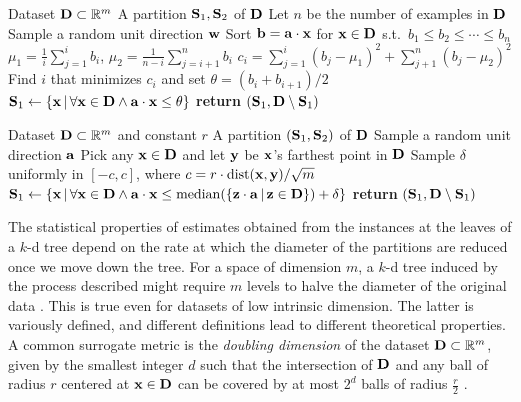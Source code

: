 \begin{algorithm}[t]
  \caption{}\label{alg:splitsid}
  \begin{algorithmic}[1]
    \Require Dataset $\mathbf{D}\subset\mathbb{R}^m$
    \Ensure A partition $\mathbf{S}_1,\mathbf{S}_2$ of $\mathbf{D}$
    \State Let $n$ be the number of examples in $\mathbf{D}$
    \State Sample a random unit direction $\mathbf{w}$
    \State Sort $\mathbf{b}=\mathbf{a}\cdot\mathbf{x}$ for $\mathbf{x}\in\mathbf{D}$ s.t.\ $b_1\leq b_2\leq\dotsb\leq b_n$
      \State $\mu_1 = \frac{1}{i}\sum_{j=1}^i b_i$, \; $\mu_2 = \frac{1}{n-i}\sum_{j=i+1}^n b_i$
      \State $c_i = \sum_{j=1}^i (b_j - \mu_1)^2 + \sum_{j+1}^n (b_j - \mu_2)^2$
    \EndFor
    \State Find $i$ that minimizes $c_i$ and set $\theta = (b_i + b_{i+1})/2$
    \State $\mathbf{S}_1 \gets \{\mathbf{x}\,|\,\forall\mathbf{x}\in\mathbf{D}\wedge\mathbf{a}\cdot\mathbf{x}\leq\theta\}$
    \State \textbf{return} $(\mathbf{S}_1,\mathbf{D} \setminus \mathbf{S}_1)$
  \end{algorithmic}
\end{algorithm}

\begin{algorithm}[t]
  \caption{}\label{alg:splitmax}
  \begin{algorithmic}[1]
    \Require Dataset $\mathbf{D} \subset \mathbb{R}^m$ and constant $r$
    \Ensure A partition $(\mathbf{S}_1,\mathbf{S}_2)$ of $\mathbf{D}$
    \State Sample a random unit direction $\mathbf{a}$
    \State Pick any $\mathbf{x}\in\mathbf{D}$ and let $\mathbf{y}$ be $\mathbf{x}$'s farthest point in $\mathbf{D}$
    \State Sample $\delta$ uniformly in $[-c,c]$, where ${c=r\cdot\operatorname{dist}(\mathbf{x},\mathbf{y})/\sqrt{m}}$
    \State $\mathbf{S}_1\gets\{\mathbf{x}\,|\,\forall\mathbf{x}\in\mathbf{D}\wedge\mathbf{a}\cdot\mathbf{x}\leq\operatorname{median}(\{\mathbf{z}\cdot\mathbf{a}\,|\,\mathbf{z}\in\mathbf{D}\})+\delta\}$
    \State \textbf{return} $(\mathbf{S}_1,\mathbf{D}\setminus\mathbf{S}_1)$
  \end{algorithmic}
\end{algorithm}

The statistical properties of estimates obtained from the instances at the leaves of a $k$-d tree
depend on the rate at which the diameter of the partitions are reduced once we move down the tree.
For a space of dimension $m$, a $k$-d tree induced by the process described might require $m$
levels to halve the diameter of the original data \citep{dasgupta08b}. This is true even for
datasets of low intrinsic dimension. The latter is variously defined, and different definitions
lead to different theoretical properties. A common surrogate metric is the \emph{doubling
dimension} of the dataset $\mathbf{D}\subset\mathbb{R}^m$, given by the smallest integer $d$ such that
the intersection of $\mathbf{D}$ and any ball of radius $r$ centered at $\mathbf{x}\in\mathbf{D}$ can be
covered by at most $2^d$ balls of radius $\frac{r}{2}$ \citep{dhesi10}.

